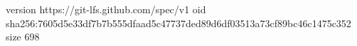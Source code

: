version https://git-lfs.github.com/spec/v1
oid sha256:7605d5e33df7b7b555dfaad5c47737ded89d6df03513a73cf89bc46c1475c352
size 698
